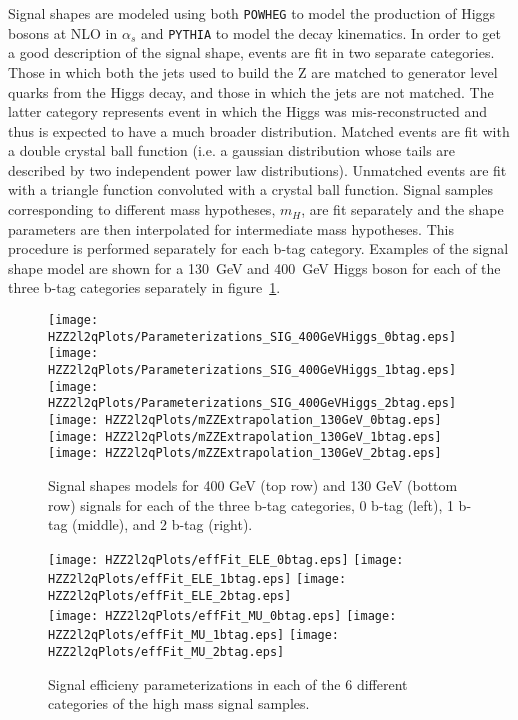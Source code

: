Signal shapes are modeled using both
{\verb+POWHEG+} to model the production of Higgs bosons at
NLO in $\alpha_s$ and {\verb+PYTHIA+} to model the decay
kinematics.  In order to get a good description of the signal
shape, events are fit in two separate categories.  Those in which 
both the jets used to build the Z are matched to generator level 
quarks from the Higgs decay, and those in which the jets are not 
matched.  The latter category represents event in which the Higgs 
was mis-reconstructed and thus is expected to have a much broader 
distribution.  Matched events are fit with a double crystal ball
function (i.e. a gaussian distribution whose tails are described
by two independent power law distributions).  Unmatched events
are fit with a triangle function convoluted with a crystal ball 
function.  Signal samples corresponding to different mass
hypotheses, $m_H$, are fit separately and the shape parameters
are then interpolated for intermediate mass hypotheses. This 
procedure is performed separately for each b-tag category.
Examples of the signal shape model are shown for a 130~GeV and
400~GeV Higgs boson for each of the three b-tag categories
separately in figure~\ref{fig:signalShapeModels}.

\begin{figure}
\begin{center}
\texttt{[image: HZZ2l2qPlots/Parameterizations\_SIG\_400GeVHiggs\_0btag.eps]}
\texttt{[image: HZZ2l2qPlots/Parameterizations\_SIG\_400GeVHiggs\_1btag.eps]}
\texttt{[image: HZZ2l2qPlots/Parameterizations\_SIG\_400GeVHiggs\_2btag.eps]}
\texttt{[image: HZZ2l2qPlots/mZZExtrapolation\_130GeV\_0btag.eps]}
\texttt{[image: HZZ2l2qPlots/mZZExtrapolation\_130GeV\_1btag.eps]}
\texttt{[image: HZZ2l2qPlots/mZZExtrapolation\_130GeV\_2btag.eps]}

\caption{Signal shapes models for 400 GeV (top row) and 130 GeV (bottom row) signals for each of the three b-tag categories, 0 b-tag (left), 1 b-tag (middle), and 2 b-tag (right).}
\label{fig:signalShapeModels}
\end{center}
\end{figure}

\begin{figure}
\begin{center}
\texttt{[image: HZZ2l2qPlots/effFit\_ELE\_0btag.eps]}
\texttt{[image: HZZ2l2qPlots/effFit\_ELE\_1btag.eps]}
\texttt{[image: HZZ2l2qPlots/effFit\_ELE\_2btag.eps]}\\
\texttt{[image: HZZ2l2qPlots/effFit\_MU\_0btag.eps]}
\texttt{[image: HZZ2l2qPlots/effFit\_MU\_1btag.eps]}
\texttt{[image: HZZ2l2qPlots/effFit\_MU\_2btag.eps]}
\caption{Signal efficieny parameterizations in each of the 6
different categories of the high mass signal samples.}
\label{fig:efficiencyHighMass}
\end{center}
\end{figure}

